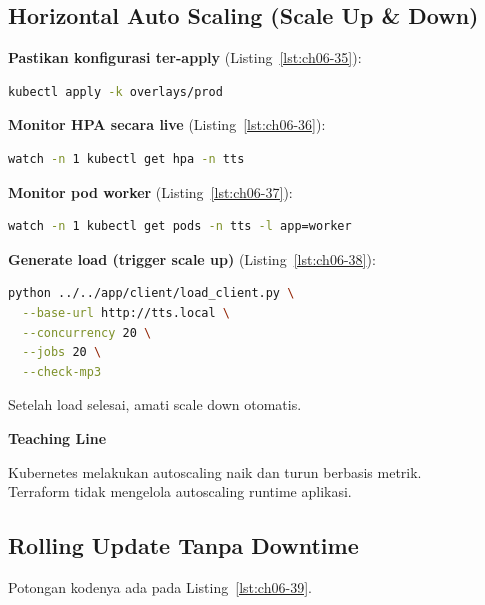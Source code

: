 \subsection{Horizontal Auto Scaling (Scale Up \& Down)}

\textbf{Pastikan konfigurasi ter-apply} (Listing~\ref{lst:ch06-35}):

\begin{lstlisting}[language=bash, caption={Menerapkan manifes Kubernetes (2)}, label={lst:ch06-35}]
kubectl apply -k overlays/prod
\end{lstlisting}

\textbf{Monitor HPA secara live} (Listing~\ref{lst:ch06-36}):

\begin{lstlisting}[language=bash, caption={Perintah watch -n 1 kubectl get hpa -n tts}, label={lst:ch06-36}]
watch -n 1 kubectl get hpa -n tts
\end{lstlisting}

\textbf{Monitor pod worker} (Listing~\ref{lst:ch06-37}):

\begin{lstlisting}[language=bash, caption={Potongan kode pada Horizontal Auto Scaling (Scale Up /\& Down)}, label={lst:ch06-37}]
watch -n 1 kubectl get pods -n tts -l app=worker
\end{lstlisting}

\textbf{Generate load (trigger scale up)} (Listing~\ref{lst:ch06-38}):

\begin{lstlisting}[language=bash, caption={Perintah python ../../app/client/load\_client.py / (2)}, label={lst:ch06-38}]
python ../../app/client/load_client.py \
  --base-url http://tts.local \
  --concurrency 20 \
  --jobs 20 \
  --check-mp3
\end{lstlisting}

Setelah load selesai, amati scale down otomatis.

\textbf{Teaching Line}

Kubernetes melakukan autoscaling naik dan turun berbasis metrik. \\
Terraform tidak mengelola autoscaling runtime aplikasi.

\subsection{Rolling Update Tanpa Downtime} Potongan kodenya ada pada Listing~\ref{lst:ch06-39}.

